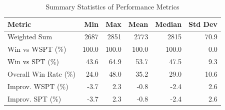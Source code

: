 \begin{table}[htbp]%
\centering%
\begin{tabular}{lrrrrr}%
\toprule%
\textbf{Metric}&\textbf{Min}&\textbf{Max}&\textbf{Mean}&\textbf{Median}&\textbf{Std Dev}\\%
\midrule%
Weighted Sum&2687&2851&2773&2815&70.9\\%
Win vs WSPT (\%)&100.0&100.0&100.0&100.0&0.0\\%
Win vs SPT (\%)&43.6&64.9&53.7&47.5&9.3\\%
Overall Win Rate (\%)&24.0&48.0&35.2&29.0&10.6\\%
Improv. WSPT (\%)&-3.7&2.3&-0.8&-2.4&2.6\\%
Improv. SPT (\%)&-3.7&2.3&-0.8&-2.4&2.6\\%
\bottomrule%
\end{tabular}%
\caption{Summary Statistics of Performance Metrics}%
\label{tab:metrics}%
\end{table}